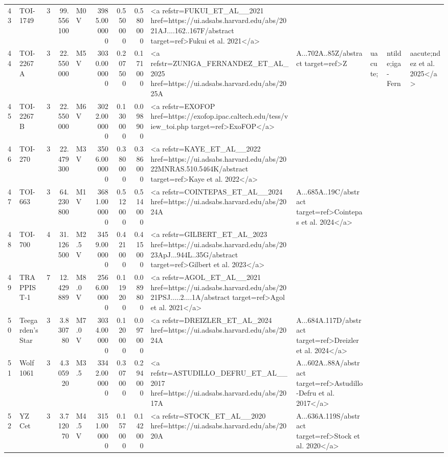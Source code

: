 \begin{tabular}{llrrlrrrl}
43 & TOI-1749 & 3 & 99.556100 & M0 V & 3985.000000 & 0.550000 & 0.580000 & <a refstr=FUKUI_ET_AL__2021 href=https://ui.adsabs.harvard.edu/abs/2021AJ....162..167F/abstract target=ref>Fukui et al. 2021</a> \\
44 & TOI-2267 A & 3 & 22.550000 & M5 V & 3030.000000 & 0.207500 & 0.171000 & <a refstr=ZUNIGA_FERNANDEZ_ET_AL_2025 href=https://ui.adsabs.harvard.edu/abs/2025A&A...702A..85Z/abstract target=ref>Z&uacute;&ntilde;iga-Fern&aacute;ndez et al. 2025</a> \\
45 & TOI-2267 B & 3 & 22.550000 & M6 V & 3022.000000 & 0.130000 & 0.098900 & <a refstr=EXOFOP href=https://exofop.ipac.caltech.edu/tess/view_toi.php target=ref>ExoFOP</a> \\
46 & TOI-270 & 3 & 22.479300 & M3 V & 3506.000000 & 0.380000 & 0.386000 & <a refstr=KAYE_ET_AL__2022 href=https://ui.adsabs.harvard.edu/abs/2022MNRAS.510.5464K/abstract target=ref>Kaye et al. 2022</a> \\
47 & TOI-663 & 3 & 64.230800 & M1 V & 3681.000000 & 0.512000 & 0.514000 & <a refstr=COINTEPAS_ET_AL__2024 href=https://ui.adsabs.harvard.edu/abs/2024A&A...685A..19C/abstract target=ref>Cointepas et al. 2024</a> \\
48 & TOI-700 & 4 & 31.126500 & M2.5 V & 3459.000000 & 0.421000 & 0.415000 & <a refstr=GILBERT_ET_AL_2023 href=https://ui.adsabs.harvard.edu/abs/2023ApJ...944L..35G/abstract target=ref>Gilbert et al. 2023</a> \\
49 & TRAPPIST-1 & 7 & 12.429889 & M8.0 V & 2566.000000 & 0.119200 & 0.089800 & <a refstr=AGOL_ET_AL__2021 href=https://ui.adsabs.harvard.edu/abs/2021PSJ.....2....1A/abstract target=ref>Agol et al. 2021</a> \\
50 & Teegarden's Star & 3 & 3.830780 & M7.0 V & 3034.000000 & 0.120000 & 0.097000 & <a refstr=DREIZLER_ET_AL_2024 href=https://ui.adsabs.harvard.edu/abs/2024A&A...684A.117D/abstract target=ref>Dreizler et al. 2024</a> \\
51 & Wolf 1061 & 3 & 4.305920 & M3.5 & 3342.000000 & 0.307000 & 0.294000 & <a refstr=ASTUDILLO_DEFRU_ET_AL__2017 href=https://ui.adsabs.harvard.edu/abs/2017A&A...602A..88A/abstract target=ref>Astudillo-Defru et al. 2017</a> \\
52 & YZ Cet & 3 & 3.712070 & M4.5 V & 3151.000000 & 0.157000 & 0.142000 & <a refstr=STOCK_ET_AL__2020 href=https://ui.adsabs.harvard.edu/abs/2020A&A...636A.119S/abstract target=ref>Stock et al. 2020</a> \\
\bottomrule
\end{tabular}
